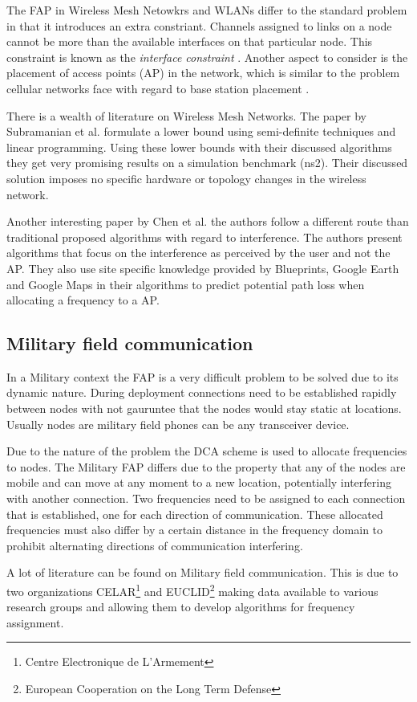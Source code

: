 The FAP in Wireless Mesh Netowkrs and WLANs differ to the standard problem in that it introduces an extra constriant. Channels assigned to links on a node cannot be more than the available interfaces on that particular node. This constraint is known as the \emph{interface constraint} \cite{MultiradioMeshNetworks}. Another aspect to consider is the placement of access points (AP) in the network, which is similar to the problem cellular networks face with regard to base station placement \cite{Karen2004}.

There is a wealth of literature on Wireless Mesh Networks. The paper by Subramanian et al.\cite{MultiradioMeshNetworks} formulate a lower bound using semi-definite techniques and linear programming. Using these lower bounds with their discussed algorithms they get very promising results on a simulation benchmark (ns2). Their discussed solution imposes no specific hardware or topology changes in the wireless network.

Another interesting paper by Chen et al.\cite{SiteFAPWLAN} the authors follow a different route than traditional proposed algorithms with regard to interference. The authors present algorithms that focus on the interference as perceived by the user and not the AP. They also use site specific knowledge provided by Blueprints, Google Earth and Google Maps in their algorithms to predict potential path loss when allocating a frequency to a AP.
\subsection{Military field communication}
In a Military context the FAP is a very difficult problem to be solved due to its dynamic nature. During deployment connections need to be established rapidly between nodes with not gauruntee that the nodes would stay static at locations. Usually nodes are military field phones can be any transceiver device. 

Due to the nature of the problem the DCA scheme is used to allocate frequencies to nodes. The Military FAP differs due to the property that any of the nodes are mobile and can move at any moment to a new location, potentially interfering with another connection. Two frequencies need to be assigned to each connection that is established, one for each direction of communication. These allocated frequencies must also differ by a certain distance in the frequency domain to prohibit alternating directions of communication interfering.

A lot of literature can be found on Military field communication. This is due to two organizations CELAR\footnote{Centre Electronique de L'Armement} and EUCLID\footnote{European Cooperation on the Long Term Defense} making data available to various research groups and allowing them to develop algorithms for frequency assignment. 

